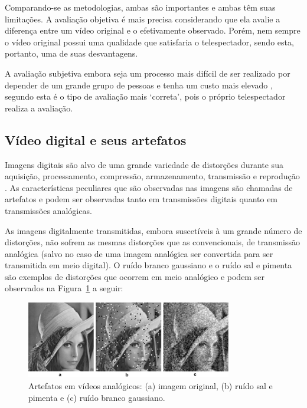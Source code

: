Comparando-se as metodologias, ambas são importantes e ambas têm suas limitações. A avaliação objetiva é mais precisa considerando que ela avalie a diferença entre um vídeo original e o efetivamente observado. Porém, nem sempre o vídeo original possui uma qualidade que satisfaria o telespectador, sendo esta, portanto, uma de suas desvantagens.

A avaliação subjetiva embora seja um processo mais difícil de ser realizado por depender de um grande grupo de pessoas e tenha um custo mais elevado \cite{albini}, segundo \cite{wangbovik2004} esta é o tipo de avaliação mais ‘correta’, pois o próprio telespectador realiza a avaliação.

\subsection{Vídeo digital e seus artefatos}

Imagens digitais são alvo de uma grande variedade de distorções durante sua aquisição, processamento, compressão, armazenamento, transmissão e reprodução \cite{wangbovik2004}. As características peculiares que são observadas nas imagens são chamadas de artefatos \cite{albini} e podem ser observadas tanto em transmissões digitais quanto em transmissões analógicas.

As imagens digitalmente transmitidas, embora suscetíveis à um grande número de distorções, não sofrem as mesmas distorções que as convencionais, de transmissão analógica (salvo no caso de uma imagem analógica ser convertida para ser transmitida em meio digital). O ruído branco gaussiano e o ruído sal e pimenta são exemplos de distorções que ocorrem em meio analógico e podem ser observados na Figura~\ref{fig:artefatosanalogicos} a seguir:

\begin{figure}[!htb]
	\centering
	\includegraphics[width=0.8\textwidth]{./imgs/figura0.png}
	\caption{Artefatos em vídeos analógicos: (a) imagem original, (b) ruído sal e pimenta e (c) ruído branco gaussiano.}
	\label{fig:artefatosanalogicos}
\end{figure}


